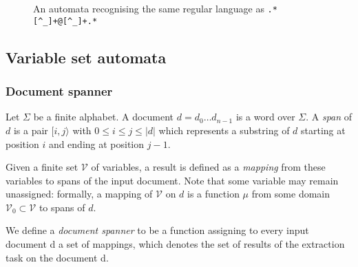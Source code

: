 \documentclass[12px]{article}
\newcommand{\Span}[1]{[#1\rangle}
\begin{document}
        \begin{figure}[ht]
            \label{fig:automata_simple}
            \centering
            \caption{An automata recognising the same regular language as
            \texttt{.*[\textasciicircum\_]+@[\textasciicircum\_]+.*}}
            \label{ex:intro-1}
          \end{figure}

    \subsection{Variable set automata}

      \subsubsection{Document spanner}

        Let $\Sigma$ be a finite alphabet. A document $d = d_0 \dots d_{n-1}$
        is a word over $\Sigma$. A \textit{span} of $d$ is a pair $\Span{i, j}$
        with $0 \leq i \leq j \leq |d|$ which represents a substring of $d$
        starting at position $i$ and ending at position $j - 1$.

        Given a finite set $\mathcal{V}$ of variables, a result is defined as a
        \textit{mapping} from these variables to spans of the input document.
        Note that some variable may remain unassigned: formally, a mapping of
        $\mathcal{V}$ on $d$ is a function $\mu$ from some domain
        $\mathcal{V}_0 \subset \mathcal{V}$ to spans of $d$.

        We define a \textit{document spanner} to be a function assigning to
        every input document d a set of mappings, which denotes the set of
        results of the extraction task on the document d.
\end{document}

